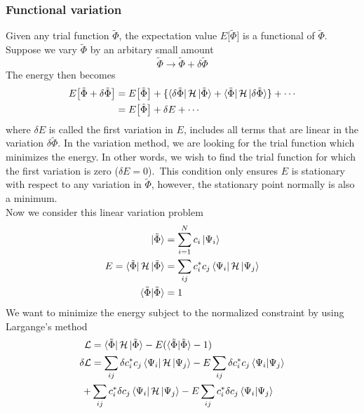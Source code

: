 \documentclass[11pt]{article}
\begin{document}
\subsubsection{Functional variation}
Given any trial function $\tilde{\Phi}$, the expectation value $E\big[\tilde{\Phi}\big]$ is a functional of $\tilde{\Phi}$. Suppose we vary $\tilde{\Phi}$ by an arbitary
small amount
\begin{equation}
    \tilde{\Phi}\rightarrow \tilde{\Phi}+\delta\tilde{\Phi}
\end{equation} 
The energy then becomes
\begin{equation}
    \begin{split}
        E\big[\tilde{\Phi}+\delta\tilde{\Phi} \big]&=E\big[\tilde{\Phi}\big]+\{\bra{\delta\tilde{\Phi}}\mathcal{H}\ket{\tilde{\Phi}}+\bra{\tilde{\Phi}}\mathcal{H}\ket{\delta\tilde{\Phi}}\}+\cdots\\
        &=E\big[\tilde{\Phi}\big]+\delta E+\cdots    
    \end{split}
\end{equation}
where $\delta E$ is called the first variation in $E$, includes all terms that are linear in the variation $\delta\tilde{\Phi}$. In the variation method, we are looking for the trial function which
minimizes the energy. In other words, we wish to find the trial function for which the first variation is zero ($\delta E=0$).\
This condition only ensures $E$ is stationary with respect to any variation in $\tilde{\Phi}$, however, the stationary point normally is also a minimum.\\
Now we consider this linear variation problem
\begin{align}
    \ket{\tilde{\Phi}}&=\sum_{i=1}^{N}c_i\ket{\Psi_i}\\
    E=\bra{\tilde{\Phi}}\mathcal{H}\ket{\tilde{\Phi}}&=\sum_{ij}c_i^*c_j\bra{\Psi_i}\mathcal{H}\ket{\Psi_j}\\
    \braket{\tilde{\Phi}|\tilde{\Phi}}&=1
\end{align}
We want to minimize the energy subject to the normalized constraint by using Largange's method
\begin{align}
    \mathcal{L}&=\bra{\tilde{\Phi}}\mathcal{H}\ket{\tilde{\Phi}}-E(\braket{\tilde{\Phi}|\tilde{\Phi}}-1)\\
    \delta\mathcal{L}&=\sum_{ij}\delta c_i^*c_j\bra{\Psi_i}\mathcal{H}\ket{\Psi_j}-E\sum_{ij}\delta c_i^*c_j\braket{\Psi_i|\Psi_j}\notag\\
    +&\sum_{ij}c_i^* \delta c_j\bra{\Psi_i}\mathcal{H}\ket{\Psi_j}-E\sum_{ij}c_i^* \delta c_j\braket{\Psi_i|\Psi_j}\\
\end{align}
\end{document}
